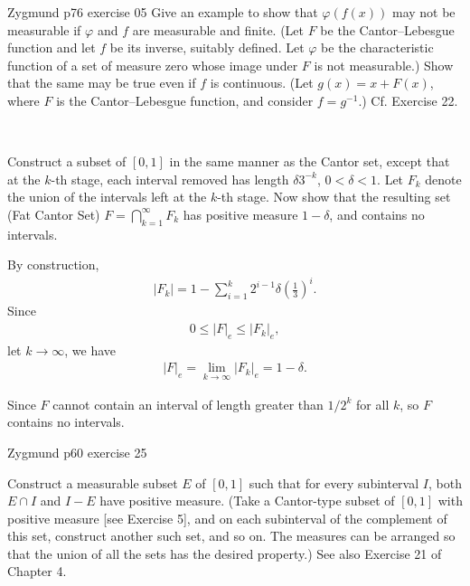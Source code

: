 \documentclass[UTF8,a4paper,10pt]{article}
\begin{document}
  \begin{Problem}[]{Zygmund p76 exercise 05}
    Give an example to show that $\varphi(f(x))$ may not be measurable if $\varphi$ and $f$ are measurable and finite. (Let $F$ be the Cantor–Lebesgue function and let $f$ be its inverse, suitably defined. Let $\varphi$ be the characteristic function of a set of measure zero whose image under $F$ is not measurable.) Show that the same may be true even if $f$ is continuous. (Let $g(x) = x + F(x)$, where $F$ is the Cantor–Lebesgue function, and consider $f = g^{-1}$.) Cf. Exercise 22.



 
  \end{Problem}

  
\begin{solution}\,

  Construct a subset of \([0, 1]\) in the same manner as the Cantor set, except that at the \(k\)-th stage, each interval removed has length \(\delta 3^{-k}\), \(0 < \delta < 1\). Let \(F_k\) denote the union of the intervals left at the \(k\)-th stage.
  Now show that the resulting set (Fat Cantor Set) \(F = \bigcap_{k=1}^{\infty} F_k \) has positive measure \(1 - \delta\), and contains no intervals.
  
  By construction,
  \begin{equation*}
    \begin{aligned}
      |F_k| = 1 - \sum_{i=1}^{k} 2^{i-1}\delta(\frac{1}{3})^i.
    \end{aligned}
  \end{equation*}
  Since
  \begin{equation*}
    \begin{aligned}
      0\leq|F|_e\leq|F_k|_e,
    \end{aligned}
  \end{equation*}
  let \(k\to \infty\), we have 
  \begin{equation*}
    \begin{aligned}
      |F|_e = \lim_{k \to \infty}|F_k|_e = 1-\delta  .
    \end{aligned}
  \end{equation*}
  
  Since \(F\) cannot contain an interval of length greater than \(1/2^k\) for all \(k\), so \(F\) contains no intervals. 
  


\end{solution}

  
\begin{Problem}[]{Zygmund p60 exercise 25}

  Construct a measurable subset \(E\) of \([0, 1]\) such that for every subinterval \(I\), both \(E \cap  I\) and \(I - E\) have positive measure. (Take a Cantor-type subset of \([0, 1]\) with positive measure [see Exercise 5], and on each subinterval of the complement of this set, construct another such set, and so on. The measures can be arranged so that the union of all the sets has the desired property.) See also Exercise 21 of Chapter 4.

\end{Problem}
\end{document}
